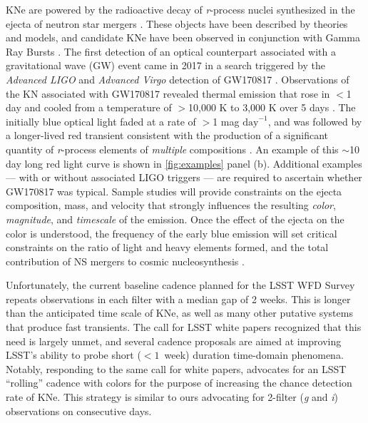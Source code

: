 \documentclass[letterpaper,longauthor,trackchanges,twocolumn,onecolappendix,sort&compress]{aastex62}
\begin{document}
KNe are powered by the radioactive decay of \emph{r}-process nuclei synthesized in the ejecta of neutron star mergers \citep{Li1998,MetzgerKN}.  These objects have been described by theories and models, and candidate KNe have been observed in conjunction with Gamma Ray Bursts \citep{Berger13, Tanvir13, Jin15}. The first detection of an optical counterpart associated with a gravitational wave (GW) event came in 2017 in a search triggered by the \emph{Advanced LIGO} \citep{Aasi15} and \emph{Advanced Virgo} \citep{Acernese15} detection of 
GW170817 \citep{Abbott2017}. Observations of the KN associated with GW170817 revealed thermal emission that rose in $<$1 day and cooled from a temperature of $>$10,000 K to 3,000 K over 5 days \citep{Drout2017}. The initially blue optical light faded at a rate of $>$1 mag $\mathrm{day}^{-1}$, and was followed by a longer-lived red transient consistent with the production of a significant quantity of \emph{r}-process elements of \emph{multiple} compositions \citep[][and references therein]{Cowp+17,Drout2017,Kasliwal2017,Smartt2017,Tanvir2017,Villar2017}. An example of this $\sim$10 day long red light curve is shown in \autoref{fig:examples} panel (b). Additional examples --- with or without associated LIGO triggers --- are required to ascertain whether GW170817 was typical. Sample studies will provide constraints on the ejecta composition, mass, and velocity that strongly influences the resulting \emph{color}, \emph{magnitude}, and \emph{timescale} of the emission. Once the effect of the ejecta on the color is understood, the frequency of the early blue emission will set critical constraints on the ratio of light and heavy elements formed, and the total contribution of NS mergers to cosmic nucleosynthesis \citep{Metzger2018,Piro2018,Rosswog2018}.

Unfortunately, the current baseline cadence planned for the LSST WFD Survey repeats observations in each filter with a median gap of 2 weeks. This is longer than the anticipated time scale of KNe, as well as many other putative systems that produce fast transients. The call for LSST white papers recognized that this need is largely unmet, and several cadence proposals are aimed at improving LSST's ability to probe short ($< 1$~week) duration time-domain phenomena. Notably, responding to the same call for white papers, \citet{Andreoni2018} advocates for an LSST ``rolling'' cadence with colors for the purpose of increasing the chance detection rate of KNe. This strategy is similar to ours advocating for 2-filter (\emph{g} and \emph{i}) observations on consecutive days. 
\end{document}
